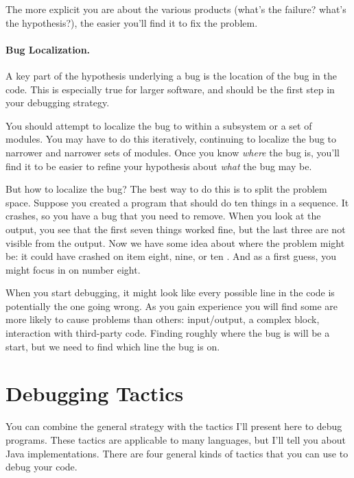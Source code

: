 The more explicit you are about the various products (what's the failure?
what's the hypothesis?), the easier you'll find it to fix the problem.

\paragraph{Bug Localization.} A key part of the hypothesis underlying
a bug is the location of the bug in the code.  This is especially true
for larger software, and should be the first step in your debugging
strategy.

You should attempt to localize the bug to within a subsystem or a set
of modules. You may have to do this iteratively, continuing to
localize the bug to narrower and narrower sets of modules. Once you
know \emph{where} the bug is, you'll find it to be easier to refine
your hypothesis about \emph{what} the bug may be.

But how to localize the bug? The best way to do this is to split the problem space. Suppose you created a program that should do ten things in a sequence. It crashes, so you have a bug that you need to remove. When you look at the output, you see that the first seven things worked fine, but the last three are not visible from the output. Now we have some idea about where the problem might be: it could have crashed on item eight, nine, or ten \cite{howToProgrammer}. And as a first guess, you might focus in on number eight. 

When you start debugging, it might look like every possible line in the code is potentially the one going wrong. As you gain experience you will find some are more likely to cause problems than others: input/output, a complex block, interaction with third-party code. Finding roughly where the bug is will be a start, but we need to find which line the bug is on. 

\section*{Debugging Tactics}
You can combine the general strategy with the tactics I'll present
here to debug programs. These tactics are applicable to many
languages, but I'll tell you about Java implementations.  There are
four general kinds of tactics that you can use to debug your code.

